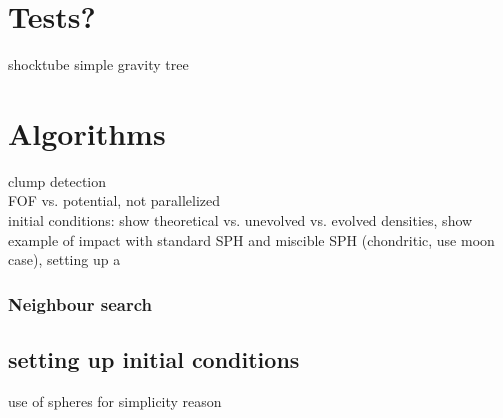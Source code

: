 \section{Tests?}
shocktube
simple gravity tree

\section{Algorithms}
clump detection\\
FOF vs. potential, not parallelized\\
initial conditions: show theoretical vs. unevolved vs. evolved densities, show example of impact with standard SPH and miscible SPH (chondritic, use moon case), setting up a \SSC \\

\subsubsection{Neighbour search}

\subsection{setting up initial conditions}
use of spheres for simplicity reason

\citep{Barnes:1986p2853}
\citep{Monaghan:2005p2677}
\citep{Price:2004p2613}





